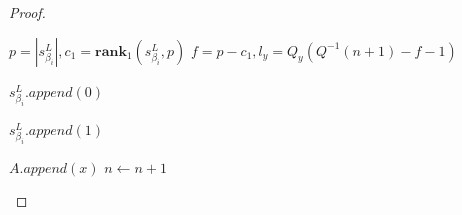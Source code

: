 \documentclass[runningheads]{llncs}
\begin{document}
\begin{proof}
\begin{algorithm}[H]
\begin{algorithmic}[1]

            
        \State $p=|s^{L}_{\beta_i}|, c_1 = \textbf{rank}_1(s^{L}_{\beta_i}, p)$
        \State $f=p-c_1, l_y = Q_{y}( Q^{-1}(n+1)-f-1 )$
        
            \State $s^L_{\beta_i}.append(0)$
        \EndIf
        
        \EndFor

                \State $s^L_{\beta_i}.append(1)$
            \EndFor
        \EndIf


        \State $A.append(x)$
        \State $n\gets n+1$
        
        \EndFunction
        \end{algorithmic}
    \end{algorithm}
    

\end{proof}
\end{document}
